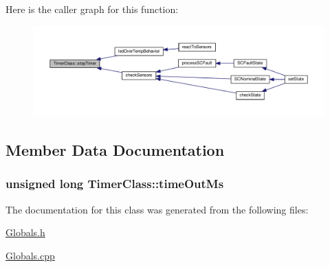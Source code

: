 Here is the caller graph for this function\+:
\nopagebreak
\begin{figure}[H]
\begin{center}
\leavevmode
\includegraphics[width=350pt]{classTimerClass_a8feed88082813446d42a26e80a3e6f1a_icgraph}
\end{center}
\end{figure}




\subsection{Member Data Documentation}
\subsubsection[{\texorpdfstring{time\+Out\+Ms}{timeOutMs}}]{\setlength{\rightskip}{0pt plus 5cm}unsigned long Timer\+Class\+::time\+Out\+Ms}\hypertarget{classTimerClass_af5618246c8a06a9e0ff2b1c11deac3da}{}\label{classTimerClass_af5618246c8a06a9e0ff2b1c11deac3da}


The documentation for this class was generated from the following files\+:\begin{DoxyCompactItemize}
\item 
\hyperlink{Globals_8h}{Globals.\+h}\item 
\hyperlink{Globals_8cpp}{Globals.\+cpp}\end{DoxyCompactItemize}
